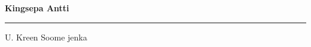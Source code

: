 \documentclass[10pt]{book}
\begin{document}
{
  \samepage
  \raggedbottom
  \raggedright
  \sloppy


  \vspace{0.2in}

  \noindent\begin{minipage}{.1\textwidth}
    \hfill\vspace{0.1in}
  \end{minipage}%
  \noindent\begin{minipage}{.8\textwidth}
    \centering
    \bfseries
    \large Kingsepa Antti
  \end{minipage}%
  \noindent\begin{minipage}{.1\textwidth}
      \hfill\vspace{0.1in}
  \end{minipage}

  \nopagebreak[4]
  \vspace{0.1in}
  \nopagebreak[4]
  \hrule height 0.05ex
  \nopagebreak[4]
  \vspace{-0.05in}

  {\footnotesize U. Kreen \hfill Soome jenka }\\
  \vspace{0.01in}



}
\end{document}
